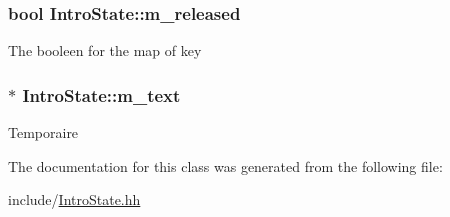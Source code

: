 \subsubsection[{m\+\_\+released}]{\setlength{\rightskip}{0pt plus 5cm}bool Intro\+State\+::m\+\_\+released\hspace{0.3cm}{\ttfamily [private]}}\label{class_intro_state_a746908a39dc856517869254b7d0a4114}
The booleen for the map of key \hypertarget{class_intro_state_ae3f313128aee34075d81f0a0faee7470}{}
\subsubsection[{m\+\_\+text}]{$\ast$ Intro\+State\+::m\+\_\+text\hspace{0.3cm}{\ttfamily [private]}}\label{class_intro_state_ae3f313128aee34075d81f0a0faee7470}
Temporaire 

The documentation for this class was generated from the following file\+:\begin{DoxyCompactItemize}
\item 
include/\hyperlink{_intro_state_8hh}{Intro\+State.\+hh}\end{DoxyCompactItemize}
